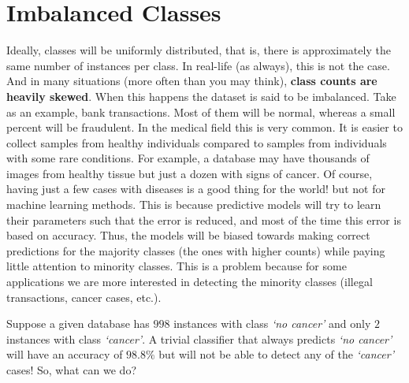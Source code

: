 \documentclass[
  11pt,
]{krantz}
\begin{document}
\hypertarget{imbalanced-classes}{%
\section{Imbalanced Classes}\label{imbalanced-classes}}

Ideally, classes will be uniformly distributed, that is, there is approximately the same number of instances per class. In real-life (as always), this is not the case. And in many situations (more often than you may think), \textbf{class counts are heavily skewed}. When this happens the dataset is said to be imbalanced. Take as an example, bank transactions. Most of them will be normal, whereas a small percent will be fraudulent. In the medical field this is very common. It is easier to collect samples from healthy individuals compared to samples from individuals with some rare conditions. For example, a database may have thousands of images from healthy tissue but just a dozen with signs of cancer. Of course, having just a few cases with diseases is a good thing for the world! but not for machine learning methods. This is because predictive models will try to learn their parameters such that the error is reduced, and most of the time this error is based on accuracy. Thus, the models will be biased towards making correct predictions for the majority classes (the ones with higher counts) while paying little attention to minority classes. This is a problem because for some applications we are more interested in detecting the minority classes (illegal transactions, cancer cases, etc.).

Suppose a given database has \(998\) instances with class \emph{`no cancer'} and only \(2\) instances with class \emph{`cancer'}. A trivial classifier that always predicts \emph{`no cancer'} will have an accuracy of \(98.8\%\) but will not be able to detect any of the \emph{`cancer'} cases! So, what can we do?
\end{document}
